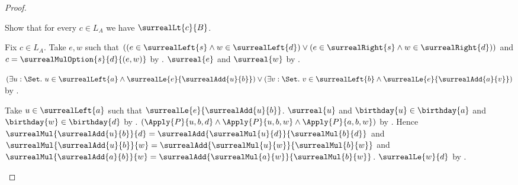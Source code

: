 \begin{proof}
\begin{subproof}
        Show that for every $c\in L_A$ we have $\surrealLt{c}{B}$.
        \begin{subproof}
            Fix $c\in L_A$.
            Take $e,w$ such that
                $((e\in\surrealLeft{s}\land w\in\surrealLeft{d})
                  \lor
                  (e\in\surrealRight{s}\land w\in\surrealRight{d}))$
                and $c=\surrealMulOption{s}{d}{(e,w)}$
                by .
            $\surreal{e}$ and $\surreal{w}$
                by .
            \begin{byCase}
                    $(\exists u:\Set.\ u\in\surrealLeft{a}\land
                            \surrealLe{e}{\surrealAdd{u}{b}})
                        \lor
                        (\exists v:\Set.\ v\in\surrealLeft{b}\land
                            \surrealLe{e}{\surrealAdd{a}{v}})$
                        by .
                    \begin{byCase}
                            Take $u\in\surrealLeft{a}$ such that
                                $\surrealLe{e}{\surrealAdd{u}{b}}$.
                            $\surreal{u}$ and
                                $\birthday{u}\in\birthday{a}$ and
                                $\birthday{w}\in\birthday{d}$
                                by .
                            $(\Apply{P}{u,b,d}
                              \land\Apply{P}{u,b,w}
                              \land\Apply{P}{a,b,w})$
                                by \auto.
                            Hence
                                $\surrealMul{\surrealAdd{u}{b}}{d}
                                    =\surrealAdd{\surrealMul{u}{d}}
                                        {\surrealMul{b}{d}}$ and
                                $\surrealMul{\surrealAdd{u}{b}}{w}
                                    =\surrealAdd{\surrealMul{u}{w}}
                                        {\surrealMul{b}{w}}$ and
                                $\surrealMul{\surrealAdd{a}{b}}{w}
                                    =\surrealAdd{\surrealMul{a}{w}}
                                        {\surrealMul{b}{w}}$.
                            $\surrealLe{w}{d}$
                                by .

\end{byCase}
\end{byCase}
\end{subproof}
\end{subproof}
\end{proof}
